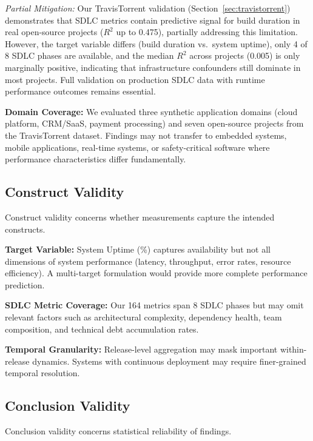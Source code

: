 \documentclass[technologies,article,submit,pdftex,moreauthors]{Definitions/mdpi}
\begin{document}
\emph{Partial Mitigation:} Our TravisTorrent validation
(Section~\ref{sec:travistorrent}) demonstrates that
SDLC metrics contain predictive signal for build duration in real
open-source projects (\(R^2\) up to 0.475), partially addressing this
limitation. However, the target variable differs (build duration
vs.~system uptime), only 4 of 8 SDLC phases are available, and the
median \(R^2\) across projects (0.005) is only marginally positive,
indicating that infrastructure confounders still dominate in most
projects. Full validation on production SDLC data with runtime
performance outcomes remains essential.

\textbf{Domain Coverage:} We evaluated three synthetic application
domains (cloud platform, CRM/SaaS, payment processing) and seven
open-source projects from the TravisTorrent dataset. Findings may not
transfer to embedded systems, mobile applications, real-time systems, or
safety-critical software where performance characteristics differ
fundamentally.

\subsection{Construct Validity}\label{sec:construct_validity}

Construct validity concerns whether measurements capture the intended
constructs.

\textbf{Target Variable:} System Uptime (\%) captures availability but
not all dimensions of system performance (latency, throughput, error
rates, resource efficiency). A multi-target formulation would provide
more complete performance prediction.

\textbf{SDLC Metric Coverage:} Our 164 metrics span 8 SDLC phases but
may omit relevant factors such as architectural complexity, dependency
health, team composition, and technical debt accumulation rates.

\textbf{Temporal Granularity:} Release-level aggregation may mask
important within-release dynamics. Systems with continuous deployment
may require finer-grained temporal resolution.

\subsection{Conclusion Validity}\label{sec:conclusion_validity}

Conclusion validity concerns statistical reliability of findings.
\end{document}
